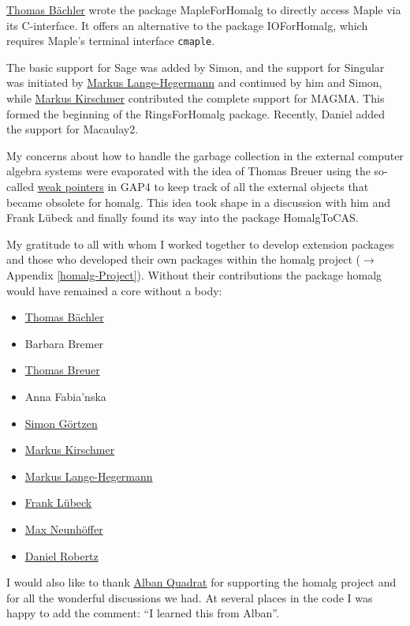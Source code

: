 \documentclass[a4paper,11pt]{report}
\begin{document}
{ \href{http://wwwb.math.rwth-aachen.de/~thomas/} {Thomas
  Bächler}  wrote the package \textsf{MapleForHomalg} to directly access \textsf{Maple} via its \textsf{C}-interface. It offers an alternative to the package \textsf{IO{\textunderscore}ForHomalg}, which requires \textsf{Maple}'s terminal interface \texttt{cmaple}. 

 The basic support for \textsf{Sage} was added by Simon, and the support for \textsf{Singular} was initiated by  \href{http://wwwb.math.rwth-aachen.de/~markus/} {Markus
  Lange-Hegermann} and continued by him and Simon, while  \href{http://www.math.rwth-aachen.de/~Markus.Kirschmer/} {Markus
  Kirschmer} contributed the complete support for \textsf{MAGMA}. This formed the beginning of the \textsf{RingsForHomalg} package. Recently, Daniel added the support for \textsf{Macaulay2}. 

 My concerns about how to handle the garbage collection in the external
computer algebra systems were evaporated with the idea of Thomas Breuer using
the so-called \href{http://www.gap-system.org/Manuals/doc/htm/ext/CHAP007.htm} {weak
  pointers}  in \textsf{GAP4} to keep track of all the external objects that became obsolete for \textsf{homalg}. This idea took shape in a discussion with him and Frank L{\"u}beck and
finally found its way into the package \textsf{HomalgToCAS}. 

 My gratitude to all with whom I worked together to develop extension packages
and those who developed their own packages within the \textsf{homalg} project ($\to$ Appendix \ref{homalg-Project}). Without their contributions the package \textsf{homalg} would have remained a core without a body: 
\begin{itemize}
\item \href{http://wwwb.math.rwth-aachen.de/~thomas/} {Thomas Bächler}
\item Barbara Bremer
\item \href{http://www.math.rwth-aachen.de/~Thomas.Breuer/} {Thomas Breuer}
\item Anna Fabia{\a'n}ska
\item \href{http://wwwb.math.rwth-aachen.de/goertzen/} {Simon Görtzen}
\item \href{http://www.math.rwth-aachen.de/~Markus.Kirschmer/} {Markus Kirschmer}
\item \href{http://wwwb.math.rwth-aachen.de/~markus/} {Markus Lange-Hegermann}
\item \href{http://www.math.rwth-aachen.de/~Frank.Luebeck/} {Frank Lübeck}
\item \href{http://www-groups.mcs.st-and.ac.uk/~neunhoef/} {Max Neunhöffer}
\item \href{http://wwwb.math.rwth-aachen.de/~daniel/} {Daniel Robertz}
\end{itemize}
 I would also like to thank  \href{http://www-sop.inria.fr/members/Alban.Quadrat/} {Alban
  Quadrat} for supporting the \textsf{homalg} project and for all the wonderful discussions we had. At several places in the
code I was happy to add the comment: ``I learned this from Alban''. 

}
\end{document}
